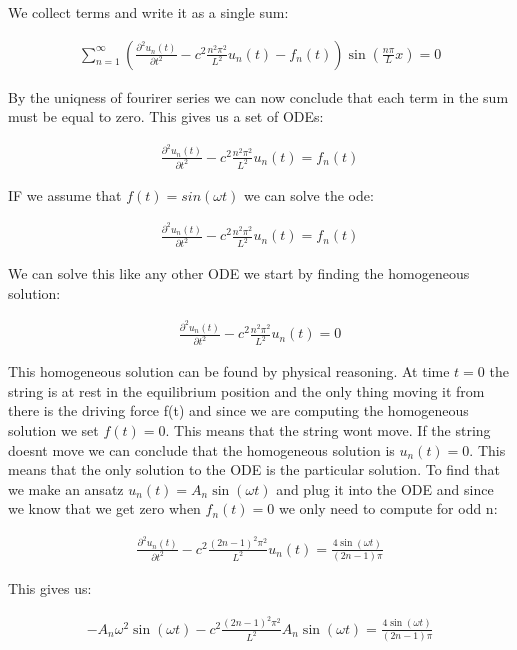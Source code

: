 \documentclass[a4paper]{article}
\begin{document}
We collect terms and write it as a single sum:

\begin{align*}
    \sum_{n=1}^{\infty} \left( \frac{\partial^2 u_n(t)}{\partial t^2} - c^2 \frac{n^2 \pi^2}{L^2} u_n(t) - f_n(t)  \right)\sin \left(\frac{n \pi}{L}x \right) = 0
\end{align*}

By the uniqness of fourirer series we can now conclude that each term in the sum must be equal to zero. This gives us a set of ODEs:

\begin{align*}
    \frac{\partial^2 u_n(t)}{\partial t^2} - c^2 \frac{n^2 \pi^2}{L^2} u_n(t) = f_n(t)
\end{align*}

IF we assume that $f(t) = sin(\omega t)$ we can solve the ode:

\begin{align*}
    \frac{\partial^2 u_n(t)}{\partial t^2} - c^2 \frac{n^2 \pi^2}{L^2} u_n(t) = f_n(t)
\end{align*}

We can solve this like any other ODE we start by finding the homogeneous solution:

\begin{align*}
    \frac{\partial^2 u_n(t)}{\partial t^2} - c^2 \frac{n^2 \pi^2}{L^2} u_n(t) = 0
\end{align*}

This homogeneous solution can be found by physical reasoning. At time $t=0$ the string is at rest in the equilibrium position and the only thing moving it from there is the driving force f(t) and since we are computing the homogeneous solution we set $f(t) = 0$. This means that the string wont move. If the string doesnt move we can conclude that the homogeneous solution is $u_n(t) = 0$.
This means that the only solution to the ODE is the particular solution. To find that we make an ansatz $u_n(t) = A_n \sin(\omega t)$ and plug it into the ODE and since we know that we get zero when $f_n(t) = 0$ we only need to compute for odd n:

\begin{align*}
    \frac{\partial^2 u_n(t)}{\partial t^2} - c^2 \frac{(2n-1)^2 \pi^2}{L^2} u_n(t) = \frac{4\sin(\omega t)}{(2n-1) \pi}
\end{align*}

This gives us:

\begin{align*}
    -A_n \omega^2 \sin(\omega t) - c^2 \frac{(2n-1)^2 \pi^2}{L^2} A_n \sin(\omega t) = \frac{4\sin(\omega t)}{(2n-1) \pi}
\end{align*}
\end{document}
